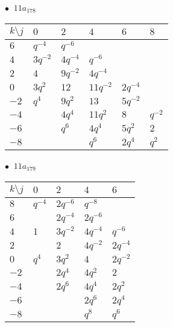 \begin{minipage}{\linewidth}
$\bullet\ $ $11a_{178}$ \vspace{0.5em} \\
\begin{tabular}{l|lllll}
$k \setminus j$ & $0$ & $2$ & $4$ & $6$ & $8$ \\
\hline
$6$ & $q^{-4}$ & $q^{-6}$ &  &  &  \\
$4$ & $3q^{-2}$ & $4q^{-4}$ & $q^{-6}$ &  &  \\
$2$ & $4$ & $9q^{-2}$ & $4q^{-4}$ &  &  \\
$0$ & $3q^{2}$ & $12$ & $11q^{-2}$ & $2q^{-4}$ &  \\
$-2$ & $q^{4}$ & $9q^{2}$ & $13$ & $5q^{-2}$ &  \\
$-4$ &  & $4q^{4}$ & $11q^{2}$ & $8$ & $q^{-2}$ \\
$-6$ &  & $q^{6}$ & $4q^{4}$ & $5q^{2}$ & $2$ \\
$-8$ &  &  & $q^{6}$ & $2q^{4}$ & $q^{2}$ \\
\end{tabular}
\vspace{2em}
\end{minipage}
%
\begin{minipage}{\linewidth}
$\bullet\ $ $11a_{179}$ \vspace{0.5em} \\
\begin{tabular}{l|llll}
$k \setminus j$ & $0$ & $2$ & $4$ & $6$ \\
\hline
$8$ & $q^{-4}$ & $2q^{-6}$ & $q^{-8}$ &  \\
$6$ &  & $2q^{-4}$ & $2q^{-6}$ &  \\
$4$ & $1$ & $3q^{-2}$ & $4q^{-4}$ & $q^{-6}$ \\
$2$ &  & $2$ & $4q^{-2}$ & $2q^{-4}$ \\
$0$ & $q^{4}$ & $3q^{2}$ & $4$ & $2q^{-2}$ \\
$-2$ &  & $2q^{4}$ & $4q^{2}$ & $2$ \\
$-4$ &  & $2q^{6}$ & $4q^{4}$ & $2q^{2}$ \\
$-6$ &  &  & $2q^{6}$ & $2q^{4}$ \\
$-8$ &  &  & $q^{8}$ & $q^{6}$ \\
\end{tabular}
\vspace{2em}
\end{minipage}
%
